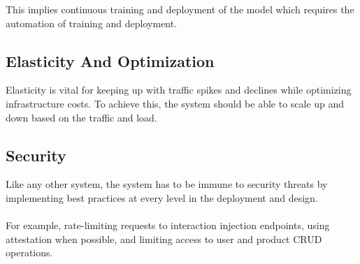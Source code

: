 This implies continuous training and deployment of the model which requires the automation of training and deployment.

\subsection{Elasticity And Optimization}

Elasticity is vital for keeping up with traffic spikes and declines while optimizing infrastructure costs. To achieve this, the system should be able to scale up and down based on the traffic and load.

\subsection{Security}

Like any other system, the system has to be immune to security threats by implementing best practices at every level in the deployment and design. \\ \\
For example, rate-limiting requests to interaction injection endpoints, using attestation when possible, and limiting access to user and product CRUD operations.
 